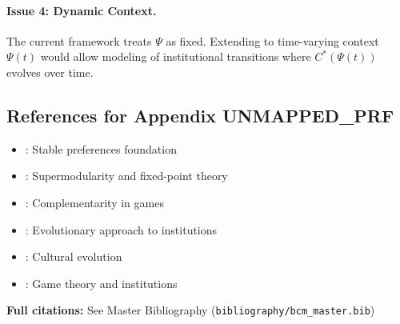 \paragraph{Issue 4: Dynamic Context.}
The current framework treats $\Psi$ as fixed. Extending to time-varying
context $\Psi(t)$ would allow modeling of institutional transitions
where $C^*(\Psi(t))$ evolves over time.


\subsection{References for Appendix UNMAPPED_PRF}
\label{sec:D-references}

\begin{itemize}[nosep]
    \item \citet{stiglerbecker1977}: Stable preferences foundation
    \item \citet{topkis1998}: Supermodularity and fixed-point theory
    \item \citet{milgromroberts1990compare}: Complementarity in games
    \item \citet{bowles2004}: Evolutionary approach to institutions
    \item \citet{boydricherson}: Cultural evolution
    \item \citet{gintis2007}: Game theory and institutions
\end{itemize}

\textbf{Full citations:} See Master Bibliography (\texttt{bibliography/bcm\_master.bib})


